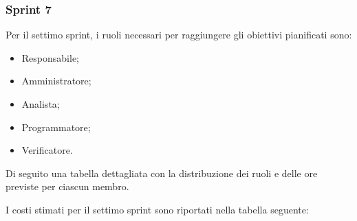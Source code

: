 
\pagebreak 
\subsubsection{Sprint 7}

Per il settimo sprint, i ruoli necessari per raggiungere gli obiettivi
pianificati sono:
\begin{itemize}
    \item Responsabile;
    \item Amministratore;
    \item Analista;
    \item Programmatore;
    \item Verificatore.
\end{itemize}


Di seguito una tabella dettagliata con la distribuzione dei ruoli e delle ore previste per ciascun membro.



I costi stimati per il settimo sprint sono riportati nella tabella seguente:

